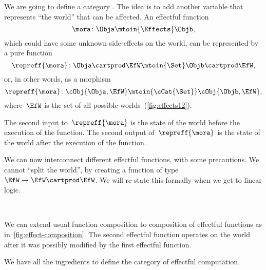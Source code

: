 We are going to define a category \Effects.
The idea is to add another variable that represents ``the world'' that can be affected.
An effectful function
%
\begin{equation}
    \mora\colon \Obja \mtoin{\Effects} \Objb,
\end{equation}
%
which could have some unknown side-effects on the world, can be represented by a pure function
\begin{equation}
    \repreff{\mora}\colon  \Obja  \cartprod \EfW \mtoin{\Set}   \Objb \cartprod \EfW,
\end{equation}
or, in other words, as a morphism
\begin{equation}
    \repreff{\mora}\colon  \cObj{\Obja,\EfW} \mtoin{\cCat{\Set}}   \cObj{\Objb, \EfW},
\end{equation}
%
where~$\EfW$ is the set of all possible worlds~(\cref{fig:effects12}).

The second input to~$\repreff{\mora}$ is the state of the world before the execution of the function.
The second output of~$\repreff{\mora}$ is the state of the world after the execution of the function.

We can now interconnect different effectful functions, with some precautions.
We cannot ``split the world'', by creating a function of type~$\EfW \to  \EfW \cartprod \EfW$.
We will re-state this formally when we get to linear logic.

\begin{marginfigure}
    \centering
    \\
    \caption{}
    \label{fig:effect-composition}
\end{marginfigure}

We can extend usual function composition to composition of effectful functions as in~\cref{fig:effect-composition}.
The second effectful function operates on the world after it was possibly modified by the first effectful function.

We have all the ingredients to define the category \Effects of effectful computation.

